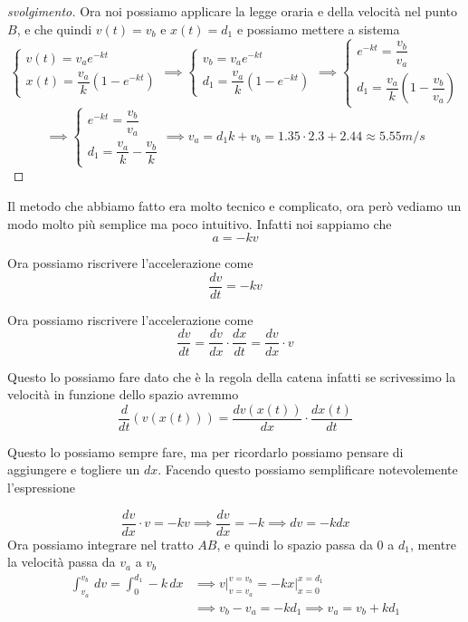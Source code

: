 \documentclass{rapport}
\begin{document}
\begin{proof}[svolgimento]
Ora noi possiamo applicare la legge oraria e della velocità nel punto $B$, e che quindi $v(t) = v_b$ e $x(t) = d_1$ e possiamo mettere a sistema
\[
\begin{cases}
  v(t) = v_a e^{-kt} \\[0.5em]
  x(t) =  \dfrac{v_a}{k}\left(1-e^{-kt}\right)
\end{cases} \implies\begin{cases}
  v_b = v_a e^{-kt} \\[0.5em]
  d_1 =  \dfrac{v_a}{k}\left(1-e^{-kt}\right)
\end{cases} \implies\begin{cases}
  e^{-kt} = \dfrac{v_b}{v_a} \\[0.5em]
  d_1 =  \dfrac{v_a}{k}\left(1-\dfrac{v_b}{v_a}\right)
\end{cases}
\]
\[
\implies\begin{cases}
  e^{-kt} = \dfrac{v_b}{v_a} \\[0.5em]
  d_1 =  \dfrac{v_a}{k}-\dfrac{v_b}{k}
\end{cases}\implies
  v_a =  d_1k + v_b= 1.35\cdot 2.3 + 2.44 \approx 5.55m/s
\]

  \end{proof}


  Il metodo che abbiamo fatto era molto tecnico e complicato, ora però vediamo un modo molto più semplice ma poco intuitivo. Infatti noi sappiamo che 
  \[
  a= -kv
  \]

  Ora possiamo riscrivere l'accelerazione come 
  \[
  \dfrac{dv}{dt} = -kv  
\]

Ora possiamo riscrivere l'accelerazione come 
\[
\dfrac{dv}{dt} = \dfrac{dv}{dx} \cdot \dfrac{dx}{dt} = \dfrac{dv}{dx} \cdot v 
\]

Questo lo possiamo fare dato che è la regola della catena infatti se scrivessimo la velocità in funzione dello spazio avremmo 
\[
\dfrac{d}{dt} (v(x(t))) = \dfrac{d v(x(t))}{dx} \cdot \dfrac{dx(t)}{dt}
\]

Questo lo possiamo sempre fare, ma per ricordarlo possiamo pensare di aggiungere e togliere un $dx$. Facendo questo possiamo semplificare notevolemente l'espressione

\[
\dfrac{dv}{dx} \cdot v = -k v \implies \dfrac{dv}{dx} = -k \implies dv = -k dx 
\]
Ora possiamo integrare nel tratto $AB$, e quindi lo spazio passa da 0 a $d_1$, mentre la velocità passa da $v_a$ a $v_b$
\begin{align*}
\int_{v_a}^{v_b}\,dv = \int_{0}^{d_1}-k \,dx &\implies \left.v \right|^{v = v_b}_{v=v_a} = \left.-kx \right|^{x = d_1}_{x=0} \\
  &\implies v_b-v_a = -kd_1  \implies v_a = v_b +kd_1 
\end{align*}
\end{document}
